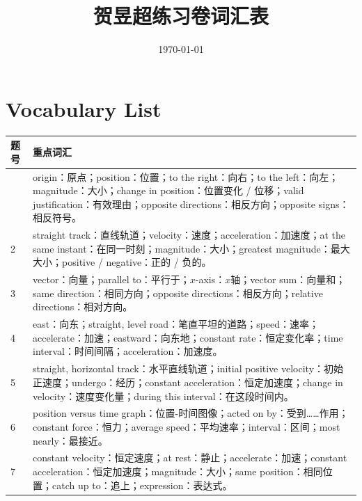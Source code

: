\documentclass[12pt,a4paper]{article}
\title{\textbf{贺昱超练习卷词汇表}}
\author{}
\date{\today}
\begin{document}
\maketitle

\section*{Vocabulary List}

\begin{longtable}{|>{\raggedright\arraybackslash}p{2.2cm}|>{\raggedright\arraybackslash}p{12.8cm}|}
\hline
\textbf{题号} & \textbf{重点词汇} \\
\hline

1 &
origin：原点；position：位置；to the right：向右；to the left：向左；magnitude：大小；change in position：位置变化 / 位移；valid justification：有效理由；opposite directions：相反方向；opposite signs：相反符号。 \\
\hline

2 &
straight track：直线轨道；velocity：速度；acceleration：加速度；at the same instant：在同一时刻；magnitude：大小；greatest magnitude：最大大小；positive / negative：正的 / 负的。 \\
\hline

3 &
vector：向量；parallel to：平行于；$x$-axis：$x$轴；vector sum：向量和；same direction：相同方向；opposite directions：相反方向；relative directions：相对方向。 \\
\hline

4 &
east：向东；straight, level road：笔直平坦的道路；speed：速率；accelerate：加速；eastward：向东地；constant rate：恒定变化率；time interval：时间间隔；acceleration：加速度。 \\
\hline

5 &
straight, horizontal track：水平直线轨道；initial positive velocity：初始正速度；undergo：经历；constant acceleration：恒定加速度；change in velocity：速度变化量；during this interval：在这段时间内。 \\
\hline

6 &
position versus time graph：位置-时间图像；acted on by：受到……作用；constant force：恒力；average speed：平均速率；interval：区间；most nearly：最接近。 \\
\hline

7 &
constant velocity：恒定速度；at rest：静止；accelerate：加速；constant acceleration：恒定加速度；magnitude：大小；same position：相同位置；catch up to：追上；expression：表达式。 \\
\hline


\end{longtable}
\end{document}
